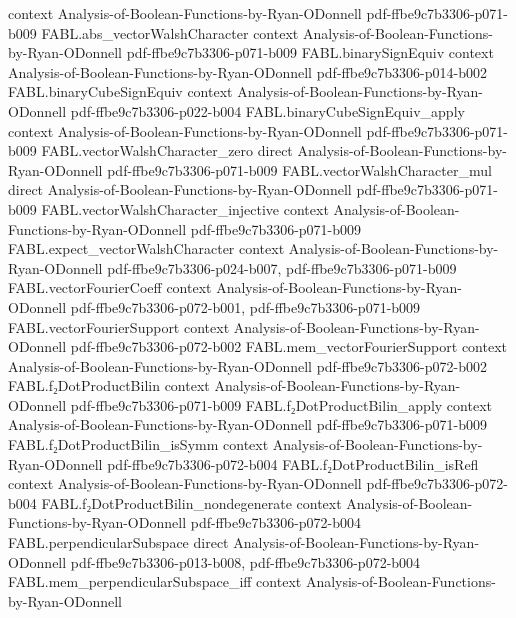 \begin{theorem}
  {context}
  {Analysis-of-Boolean-Functions-by-Ryan-ODonnell}
  {pdf-ffbe9c7b3306-p071-b009}
\proofstep
  {FABL.abs_vectorWalshCharacter}
  {context}
  {Analysis-of-Boolean-Functions-by-Ryan-ODonnell}
  {pdf-ffbe9c7b3306-p071-b009}
\proofstep
  {FABL.binarySignEquiv}
  {context}
  {Analysis-of-Boolean-Functions-by-Ryan-ODonnell}
  {pdf-ffbe9c7b3306-p014-b002}
\proofstep
  {FABL.binaryCubeSignEquiv}
  {context}
  {Analysis-of-Boolean-Functions-by-Ryan-ODonnell}
  {pdf-ffbe9c7b3306-p022-b004}
\proofstep
  {FABL.binaryCubeSignEquiv_apply}
  {context}
  {Analysis-of-Boolean-Functions-by-Ryan-ODonnell}
  {pdf-ffbe9c7b3306-p071-b009}
\proofstep
  {FABL.vectorWalshCharacter_zero}
  {direct}
  {Analysis-of-Boolean-Functions-by-Ryan-ODonnell}
  {pdf-ffbe9c7b3306-p071-b009}
\proofstep
  {FABL.vectorWalshCharacter_mul}
  {direct}
  {Analysis-of-Boolean-Functions-by-Ryan-ODonnell}
  {pdf-ffbe9c7b3306-p071-b009}
\proofstep
  {FABL.vectorWalshCharacter_injective}
  {context}
  {Analysis-of-Boolean-Functions-by-Ryan-ODonnell}
  {pdf-ffbe9c7b3306-p071-b009}
\proofstep
  {FABL.expect_vectorWalshCharacter}
  {context}
  {Analysis-of-Boolean-Functions-by-Ryan-ODonnell}
  {pdf-ffbe9c7b3306-p024-b007,
    pdf-ffbe9c7b3306-p071-b009}
\proofstep
  {FABL.vectorFourierCoeff}
  {context}
  {Analysis-of-Boolean-Functions-by-Ryan-ODonnell}
  {pdf-ffbe9c7b3306-p072-b001,
    pdf-ffbe9c7b3306-p071-b009}
\proofstep
  {FABL.vectorFourierSupport}
  {context}
  {Analysis-of-Boolean-Functions-by-Ryan-ODonnell}
  {pdf-ffbe9c7b3306-p072-b002}
\proofstep
  {FABL.mem_vectorFourierSupport}
  {context}
  {Analysis-of-Boolean-Functions-by-Ryan-ODonnell}
  {pdf-ffbe9c7b3306-p072-b002}
\proofstep
  {FABL.f₂DotProductBilin}
  {context}
  {Analysis-of-Boolean-Functions-by-Ryan-ODonnell}
  {pdf-ffbe9c7b3306-p071-b009}
\proofstep
  {FABL.f₂DotProductBilin_apply}
  {context}
  {Analysis-of-Boolean-Functions-by-Ryan-ODonnell}
  {pdf-ffbe9c7b3306-p071-b009}
\proofstep
  {FABL.f₂DotProductBilin_isSymm}
  {context}
  {Analysis-of-Boolean-Functions-by-Ryan-ODonnell}
  {pdf-ffbe9c7b3306-p072-b004}
\proofstep
  {FABL.f₂DotProductBilin_isRefl}
  {context}
  {Analysis-of-Boolean-Functions-by-Ryan-ODonnell}
  {pdf-ffbe9c7b3306-p072-b004}
\proofstep
  {FABL.f₂DotProductBilin_nondegenerate}
  {context}
  {Analysis-of-Boolean-Functions-by-Ryan-ODonnell}
  {pdf-ffbe9c7b3306-p072-b004}
\proofstep
  {FABL.perpendicularSubspace}
  {direct}
  {Analysis-of-Boolean-Functions-by-Ryan-ODonnell}
  {pdf-ffbe9c7b3306-p013-b008,
    pdf-ffbe9c7b3306-p072-b004}
\proofstep
  {FABL.mem_perpendicularSubspace_iff}
  {context}
  {Analysis-of-Boolean-Functions-by-Ryan-ODonnell}

\end{theorem}
